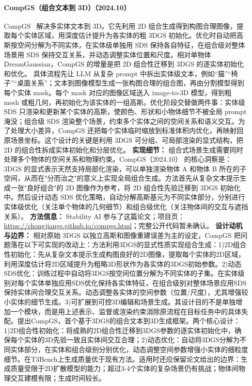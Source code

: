 \paragraph{CompGS（组合文本到 3D）（2024.10）}
CompGS~\cite{2410_20723} 解决多实体文本到 3D。它先利用 2D 组合生成得到构图合理图像，提取每个实体区域，用深度估计提升为各实体的粗 3DGS 初始化。优化时自动把高斯按空间分解为不同实体，在实体级单独用 SDS 保持各自特征，在组合级对整体场景用 SDS 保持交互关系，并动态调整实体位置和尺度。相对单物体 DreamGaussian，CompGS 的增量是把 2D 组合性迁移到 3DGS 的逐实体初始化和优化。
具体流程先让 LLM 从复杂 prompt 中拆出实体级文本，例如“猫”“椅子”“桌面关系”；文本到图像模型生成一张构图合理的组合图，再由分割模型得到每个实体 mask。每个 mask 对应的图像区域送入 image-to-3D 模型，得到粗 mesh 或粗几何，再初始化为该实体的一组高斯。优化阶段交替做两件事：实体级 SDS 只渲染和更新某个实体的高斯，使颜色、形状和小物体细节不被全局 prompt 淹没；组合级 SDS 渲染整个场景，约束多个实体之间的空间关系和语义交互。为了处理大小差异，CompGS 还把每个实体临时缩放到标准体积内优化，再映射回原场景坐标。这个设计的关键是利用 3DGS 可分组、可局部渲染的显式结构，把 2D 的组合性拆成实体初始化和分层优化。
\textbf{实现细节：} 组合式场景生成需要同时处理多个物体的空间关系和物理约束。CompGS（2024.10） 的核心洞察是：3DGS 的显式表示天然支持局部化渲染，可以单独渲染物体 A 和物体 B 所在的子空间，从而在"分而治之"的意义上实现全局组合生成。方法首先从复杂文本提示生成一张"良好组合"的 2D 图像作为参考，将 2D 组合性先验迁移到 3DGS 初始化中。然后设计动态 SDS 优化策略，自动分解高斯基元为不同实体部分，分别进行实体级优化（关注单个物体的几何细节）和组合级优化（关注物体间的交互与遮挡关系）。
\textbf{方法信息：} Stability AI 参与了这篇论文；项目页：\url{https://chongjiange.github.io/compgs.html}；完整公开代码暂未确认。
\textbf{设计动机与边界：} 相对原始 3DGS 以独立高斯和图像重建误差为主的设定，CompGS 把问题落在以下可实现的改动上：方法利用3DGS的显式性质实现组合生成：1)2D组合性初始化：先从复杂文本提示生成构图良好的2D图像，提取每个实体的2D区域，利用深度估计将2D区域提升为粗略3D形状作为各实体的3DGS初始参数。2)动态SDS优化：训练过程中自动将3DGS按空间位置分解为不同实体的子集。在实体级别对每个实体单独应用SDS优化保持各实体特征，在组合级别对整体场景应用SDS保持实体间合理交互关系。动态调整各实体的空间参数（位置/尺度），尤其增强较小实体的细节生成。3)可扩展到可控3D编辑和场景生成。其设计目的不是单独增加一个模块，而是用上述表示、监督或渲染约束消除原流程在目标任务中的具体失配。提出CompGS，首个基于3DGS的组合文本到3D生成框架。两个核心设计：1)2D组合性初始化：将成熟的2D组合性迁移到3DGS参数的逐实体初始化中，确保每个实体的3D先验一致且实体间交互合理；2)动态优化：自动将3DGS分解为不同实体部分，在实体和组合级别分别优化，动态调整空间参数增强小实体的细粒度细节。在T3Bench上生成质量优于现有方法。适用时还应保留论文给出的边界：生成质量受限于2D扩散模型的能力；超过3-4个实体的复杂场景仍有挑战；物体间物理交互建模有限；生成时间较长。
